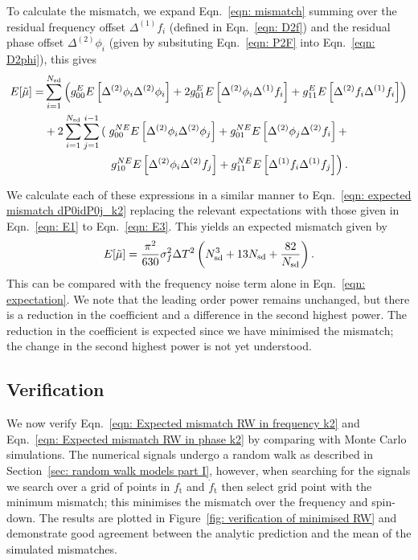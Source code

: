 \documentclass[../full_thesis/full_thesis.tex]{subfiles}
\begin{document}
To calculate the mismatch, we expand Eqn.~\eqref{eqn: mismatch} summing over
the residual frequency offset $\Delta^{(1)}f_i$ (defined in Eqn.~\eqref{eqn:
D2f}) and the residual phase offset $\Delta^{(2)}\phi_i$ (given by
subsituting Eqn.~\eqref{eqn: P2F} into Eqn.~\eqref{eqn: D2phi}), this gives
\begin{align}
\begin{split}
E[\mutilde] = &
\s{i=1}{\Nsd}\left(g_{00}^{E}E\left[\Delta^{(2)}\phi_{i}\Delta^{(2)}\phi_{i}\right]
+ 2 g_{01}^{E}E\left[\Delta^{(2)}\phi_{i}\Delta^{(1)}\f_{i}\right]
+  g_{11}^{E} E\left[\Delta^{(2)}\f_{i}\Delta^{(1)}\f_{i}\right] \right) \\
& + 2\s{i=1}{\Nsd}\s{j=1}{i-1}\left(\right.
g_{00}^{NE}E\left[\Delta^{(2)}\phi_{i}\Delta^{(2)}\phi_{j}\right] +
g_{01}^{NE}E\left[\Delta^{(2)}\phi_{j}\Delta^{(2)}\f_{i}\right] +  \\
&\hspace{20mm}\left. g_{10}^{NE}E\left[\Delta^{(2)}\phi_{i}\Delta^{(2)}\f_{j}\right] +
g_{11}^{NE} E\left[\Delta^{(1)}\f_{i}\Delta^{(1)}\f_{j}\right] \right).
\end{split}
\end{align}


We calculate each of these expressions in a similar manner to Eqn.~\eqref{eqn:
expected mismatch dP0idP0j_k2} replacing the relevant expectations with those
given in Eqn.~\eqref{eqn: E1} to Eqn.~\eqref{eqn: E3}. This yields an expected
mismatch given by
\begin{equation}
E[\tilde{\mu}] = \frac{\pi^{2} }{630} \sigma_{f}^{2} \Delta T^{2}  \left(N_{\textrm{sd}}^{3} + 13N_{\textrm{sd}} + \frac{82}{N_{\textrm{sd}}} \right).
\label{eqn: Expected mismatch RW in frequency k2}
\end{equation}
This can be compared with the frequency noise term alone in Eqn.~\eqref{eqn:
expectation}. We note that the leading order power remains unchanged, but there
is a reduction in the coefficient and a difference in the second highest
power. The reduction in the coefficient is expected since we have minimised
the mismatch; the change in the second highest power is not yet understood.

\subsection{Verification}

We now verify Eqn.~\eqref{eqn: Expected mismatch RW in frequency k2} and
Eqn.~\eqref{eqn: Expected mismatch RW in phase k2} by comparing with Monte
Carlo simulations. The numerical signals undergo a random walk as described in
Section~\ref{sec: random walk models part I}, however, when searching for the
signals we search over a grid of points in $f_\textrm{t}$ and
$\dot{f}_\textrm{t}$ then select grid point with the minimum mismatch; this
minimises the mismatch over the frequency and spin-down. The results are
plotted in Figure~\ref{fig: verification of minimised RW} and demonstrate good
agreement between the analytic prediction and the mean of the simulated
mismatches.
\end{document}
